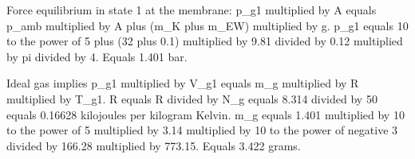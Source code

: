Force equilibrium in state 1 at the membrane:  
p_g1 multiplied by A equals p_amb multiplied by A plus (m_K plus m_EW) multiplied by g.  
p_g1 equals 10 to the power of 5 plus (32 plus 0.1) multiplied by 9.81 divided by 0.12 multiplied by pi divided by 4.  
Equals 1.401 bar.  

Ideal gas implies p_g1 multiplied by V_g1 equals m_g multiplied by R multiplied by T_g1.  
R equals R divided by N_g equals 8.314 divided by 50 equals 0.16628 kilojoules per kilogram Kelvin.  
m_g equals 1.401 multiplied by 10 to the power of 5 multiplied by 3.14 multiplied by 10 to the power of negative 3 divided by 166.28 multiplied by 773.15.  
Equals 3.422 grams.